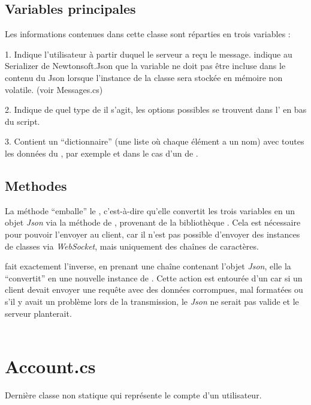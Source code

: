 \documentclass[12pt]{report}
\begin{document}
\subsection{Variables principales}
Les informations contenues dans cette classe sont réparties en trois variables :

1. Indique l'utilisateur à partir duquel le serveur a reçu le message. 
\code{[JsonIgnore]} indique au Serializer de Newtonsoft.Json que la variable ne doit pas être incluse dans le contenu du Json lorsque l'instance de la classe sera stockée en mémoire non volatile. (voir Messages.cs)

2. Indique de quel type de  il s'agit, les options possibles se trouvent dans l’  en bas du script.

3. Contient un “dictionnaire” (une liste où chaque élément a un nom) avec toutes les données du , par exemple  et  dans le cas d'un  de  .

\subsection{Methodes}
La méthode  “emballe” le , c'est-à-dire qu'elle convertit les trois variables en un objet \textit{Json} via la méthode  de , provenant de la bibliothèque . Cela est nécessaire pour pouvoir l'envoyer au client, car il n'est pas possible d'envoyer des instances de classes via \textit{WebSocket}, mais uniquement des chaînes de caractères.

 fait exactement l'inverse, en prenant une chaîne contenant l'objet \textit{Json}, elle la “convertit” en une nouvelle instance de . Cette action est entourée d'un  car si un client devait envoyer une requête avec des données corrompues, mal formatées ou s'il y avait un problème lors de la transmission, le \textit{Json} ne serait pas valide et le serveur planterait.
\\\\
\section{Account.cs}
Dernière classe non statique qui représente le compte d'un utilisateur.
\end{document}
